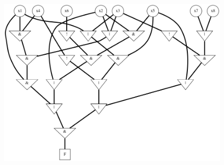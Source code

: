 \documentclass[makeidx, a4paper, 14pt]{extarticle}
\begin{document}
\begin{figure}[H]
    \includegraphics[scale=0.4]{example6.png}
\end{figure}
\end{document}
